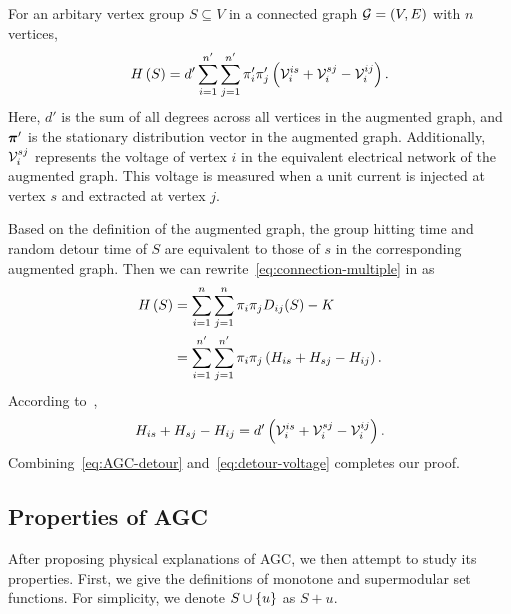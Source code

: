 \documentclass[10pt,journal,compsoc,twocolumn,twoside]{IEEEtran}
\begin{document}
\begin{theorem}\label{thm:connection-electrical}
    For an arbitary vertex group \(S\subseteq V\) in a connected graph \(\mathcal{G}=(V,E)\) with \(n\) vertices,
    \begin{equation}\label{eq:connection-electrical}
        H\left(S\right)=d'\sum_{i=1}^{n'}\sum_{j=1}^{n'}\pi'_i\pi'_j\left( \mathcal{V}_i^{is}+\mathcal{V}_i^{sj}-\mathcal{V}_i^{ij} \right).
    \end{equation}
    Here, \(d'\) is the sum of all degrees across all vertices in the augmented graph, and \(\boldsymbol{\pi}'\) is the stationary distribution vector in the augmented graph.
    Additionally, \(\mathcal{V}_i^{sj}\) represents the voltage of vertex \(i\) in the equivalent electrical network of the augmented graph.
    This voltage is measured when a unit current is injected at vertex \(s\) and extracted at vertex \(j\).
\end{theorem}
\begin{IEEEproof}
    Based on the definition of the augmented graph, the group hitting time and random detour time of \(S\) are equivalent to those of \(s\) in the corresponding augmented graph.
    Then we can rewrite~\eqref{eq:connection-multiple} in  as
    \begin{equation}\label{eq:AGC-detour}
        \begin{split}
            H\left(S\right)&=\sum_{i=1}^n\sum_{j=1}^n\pi_i\pi_jD_{ij}(S)-K\\
            &=\sum_{i=1}^{n'}\sum_{j=1}^{n'}\pi_i\pi_j\left( H_{is}+H_{sj}-H_{ij} \right).
        \end{split}
    \end{equation}
    According to~\cite{RaZh13},
    \begin{equation}\label{eq:detour-voltage}
        H_{is}+H_{sj}-H_{ij}=d'\left( \mathcal{V}_i^{is}+\mathcal{V}_i^{sj}-\mathcal{V}_i^{ij} \right).
    \end{equation}
    Combining~\eqref{eq:AGC-detour} and~\eqref{eq:detour-voltage} completes our proof.
\end{IEEEproof}


\subsection{Properties of AGC}

After proposing physical explanations of AGC, we then attempt to study its properties.
First, we give the definitions of monotone and supermodular set functions. For simplicity, we denote \(S\cup\left\{u \right\}\) as \(S+u\).
\end{document}
